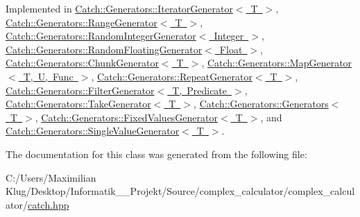 Implemented in \mbox{\hyperlink{class_catch_1_1_generators_1_1_iterator_generator_acafb4fa1eebe5e1db571621a35a3f137}{Catch\+::\+Generators\+::\+Iterator\+Generator$<$ T $>$}}, \mbox{\hyperlink{class_catch_1_1_generators_1_1_range_generator_a4e6b2038832f09724d5a4355b4691259}{Catch\+::\+Generators\+::\+Range\+Generator$<$ T $>$}}, \mbox{\hyperlink{class_catch_1_1_generators_1_1_random_integer_generator_aaa3db70fbdfa3e8dcb61fb5592eba81f}{Catch\+::\+Generators\+::\+Random\+Integer\+Generator$<$ Integer $>$}}, \mbox{\hyperlink{class_catch_1_1_generators_1_1_random_floating_generator_a6a65e5f16abd884f58c31581b2a0d6db}{Catch\+::\+Generators\+::\+Random\+Floating\+Generator$<$ Float $>$}}, \mbox{\hyperlink{class_catch_1_1_generators_1_1_chunk_generator_a545e89f80eb1e3c953491541ea083f86}{Catch\+::\+Generators\+::\+Chunk\+Generator$<$ T $>$}}, \mbox{\hyperlink{class_catch_1_1_generators_1_1_map_generator_aa07e2f12d38ae060c30cc30d9dc236c5}{Catch\+::\+Generators\+::\+Map\+Generator$<$ T, U, Func $>$}}, \mbox{\hyperlink{class_catch_1_1_generators_1_1_repeat_generator_a24d5c2b1c09d6d220d4bd4c83f222dcb}{Catch\+::\+Generators\+::\+Repeat\+Generator$<$ T $>$}}, \mbox{\hyperlink{class_catch_1_1_generators_1_1_filter_generator_a02ce0839dcaa7545c55d0fe70cc50e84}{Catch\+::\+Generators\+::\+Filter\+Generator$<$ T, Predicate $>$}}, \mbox{\hyperlink{class_catch_1_1_generators_1_1_take_generator_ae343f3e28fe04e0a20d6fdf69bfb4c78}{Catch\+::\+Generators\+::\+Take\+Generator$<$ T $>$}}, \mbox{\hyperlink{class_catch_1_1_generators_1_1_generators_ad127fd2a07347b527f79ab3b78bd40fb}{Catch\+::\+Generators\+::\+Generators$<$ T $>$}}, \mbox{\hyperlink{class_catch_1_1_generators_1_1_fixed_values_generator_a6ce9e3ed045239c7b82873f24bd9cd3b}{Catch\+::\+Generators\+::\+Fixed\+Values\+Generator$<$ T $>$}}, and \mbox{\hyperlink{class_catch_1_1_generators_1_1_single_value_generator_a10833b34e3ccbc484624185712eb8b6e}{Catch\+::\+Generators\+::\+Single\+Value\+Generator$<$ T $>$}}.



The documentation for this class was generated from the following file\+:\begin{DoxyCompactItemize}
\item 
C\+:/\+Users/\+Maximilian Klug/\+Desktop/\+Informatik\+\_\+\_\+\+Projekt/\+Source/complex\+\_\+calculator/complex\+\_\+calculator/\mbox{\hyperlink{catch_8hpp}{catch.\+hpp}}\end{DoxyCompactItemize}
